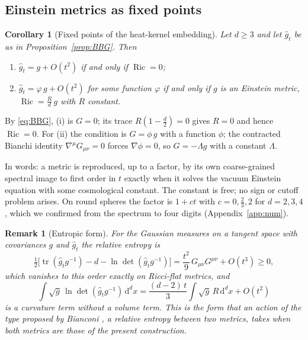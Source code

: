 \documentclass[11pt,a4paper]{article}
\makeatletter
\theoremstyle{stmt}
\newtheorem{corollary}[theorem]{Corollary}
\theoremstyle{defn}
\theoremstyle{rmk}
\newtheorem{remark}[theorem]{Remark}
\renewenvironment{proof}[1][\proofname]{\par\pushQED{\qed}\normalfont\topsep6\p@\@plus6\p@\relax
  \trivlist\item[\hskip\labelsep{\sffamily\itshape\small #1.}]\ignorespaces}{\popQED\endtrivlist\@endpefalse}
\numberwithin{equation}{section}
\DeclareMathOperator{\tr}{tr}
\DeclareMathOperator{\Ric}{Ric}
\newcommand{\dd}{\mathrm{d}}
\makeatother
\begin{document}
\subsection{Einstein metrics as fixed points}

\begin{corollary}[Fixed points of the heat-kernel embedding]\label{cor:fixed}
Let $d\ge3$ and let $\hat g_t$ be as in Proposition~\ref{prop:BBG}. Then
\begin{enumerate}
\item[(i)] $\hat g_t=g+O(t^2)$ if and only if $\Ric=0$;
\item[(ii)] $\hat g_t=\varphi\,g+O(t^2)$ for some function $\varphi$ if and only if $g$ is an Einstein metric, $\Ric=\tfrac Rd\,g$ with $R$ constant.
\end{enumerate}
\end{corollary}

\begin{proof}
By \eqref{eq:BBG}, (i) is $G=0$; its trace $R(1-\tfrac d2)=0$ gives $R=0$ and hence $\Ric=0$. For (ii) the condition is $G=\phi\,g$ with a function $\phi$; the contracted Bianchi identity $\nabla^\mu G_{\mu\nu}=0$ forces $\nabla\phi=0$, so $G=-\Lambda g$ with a constant $\Lambda$.
\end{proof}

In words: a metric is reproduced, up to a factor, by its own coarse-grained spectral image to first order in $t$ exactly when it solves the vacuum Einstein equation with some cosmological constant. The constant is free; no sign or cutoff problem arises. On round spheres the factor is $1+ct$ with $c=0,\tfrac23,2$ for $d=2,3,4$, which we confirmed from the spectrum to four digits (Appendix~\ref{app:num}).

\begin{remark}[Entropic form]
For the Gaussian measures on a tangent space with covariances $g$ and $\hat g_t$ the relative entropy is
\begin{equation}
\tfrac12\big[\tr(\hat g_tg^{-1})-d-\ln\det(\hat g_tg^{-1})\big]=\frac{t^2}{9}\,G_{\mu\nu}G^{\mu\nu}+O(t^3)\ge0,
\end{equation}
which vanishes to this order exactly on Ricci-flat metrics, and
\[\int\sqrt g\,\ln\det(\hat g_tg^{-1})\,\dd^dx=\frac{(d-2)\,t}{3}\int\sqrt g\,R\,\dd^dx+O(t^2)\]
is a curvature term without a volume term. This is the form that an action of the type proposed by Bianconi \cite{Bianconi}, a relative entropy between two metrics, takes when both metrics are those of the present construction.
\end{remark}
\end{document}
